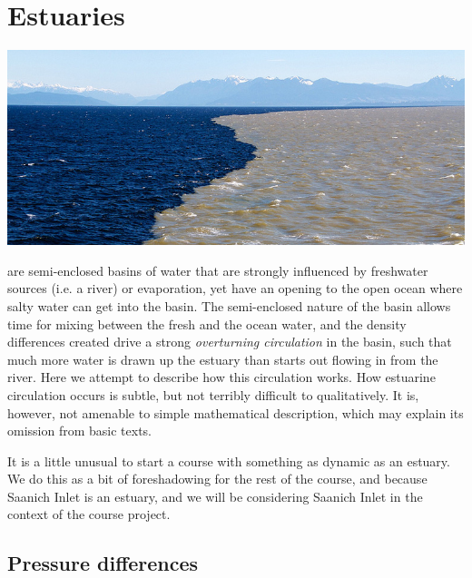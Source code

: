 \chapter{Estuaries}
\label{chap:Estuaries}

\includegraphics[width=6.5in]{figs/ed_mcnichol_boundary_smaller.jpg}


 are semi-enclosed basins of water that are strongly influenced by freshwater sources (i.e. a river) or evaporation, yet have an opening to the open ocean where salty water can get into the basin.  The semi-enclosed nature of the basin allows time for mixing between the fresh and the ocean water, and the density differences created drive a strong \emph{overturning circulation} in the basin, such that much more water is drawn up the estuary than starts out flowing in from the river.  Here we attempt to describe how this circulation works. How estuarine circulation occurs is subtle, but not terribly difficult to qualitatively.  It is, however, not amenable to simple mathematical description, which may explain its omission from basic texts.

It is a little unusual to start a course with something as dynamic as an estuary. We do this as a bit of foreshadowing for the rest of the course, and because Saanich Inlet is an estuary, and we will be considering Saanich Inlet in the context of the course project.  

\section{Pressure differences}

